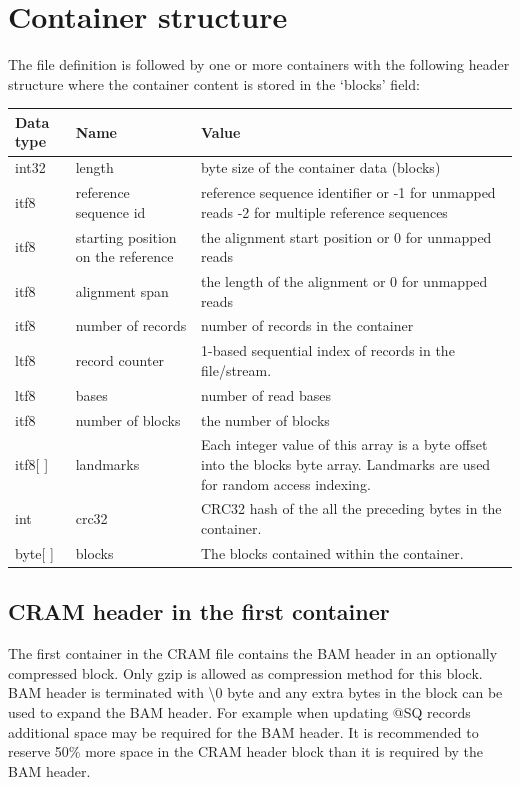 \documentclass[a4paper]{article}
\begin{document}
\section{\textbf{Container structure}}

The file definition is followed by one or more containers with the following header 
structure where the container content is stored in the `blocks' field:

\begin{tabular}{|l|>{\raggedright}p{120pt}|>{\raggedright}p{260pt}|}
\hline
\textbf{Data type} & \textbf{Name} & \textbf{Value}
\tabularnewline
\hline
int32 & length & byte size of the container data (blocks)\tabularnewline
\hline
itf8 & reference sequence id & reference sequence identifier  or\linebreak{}
-1 for unmapped reads\linebreak{}
-2 for multiple reference sequences\tabularnewline
\hline
itf8 & starting position on the reference & the alignment start position or\linebreak{}
0 for unmapped reads\tabularnewline
\hline
itf8 & alignment span & the length of the alignment or\linebreak{}
0 for unmapped reads\tabularnewline
\hline
itf8 & number of records & number of records in the container\tabularnewline
\hline
ltf8 & record counter & 1-based sequential index of records in the file/stream.\tabularnewline
\hline
ltf8 & bases & number of read bases\tabularnewline
\hline
itf8 & number of blocks & the number of blocks\tabularnewline
\hline
itf8[ ] & landmarks & Each integer value of this array is a byte offset into the 
blocks byte array. Landmarks are used for random access indexing.\tabularnewline
\hline
int & crc32 & CRC32 hash of the all the preceding bytes in the container.\tabularnewline
\hline
byte[ ] & blocks & The blocks contained within the container.\tabularnewline
\hline
\end{tabular}

\subsection{\textbf{CRAM header in the first container}}

The first container in the CRAM file contains the BAM header in an optionally
compressed block. Only gzip is allowed as compression method for this block. BAM
header is terminated with \textbackslash{}0 byte and any extra bytes in the
block can be used to expand the BAM header. For example when updating @SQ
records additional space may be required for the BAM header. It is recommended
to reserve 50\% more space in the CRAM header block than it is required by the
BAM header.
\end{document}
